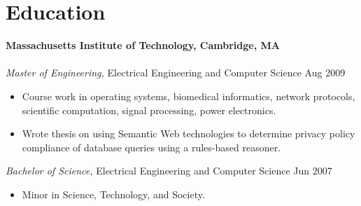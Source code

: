 \section{Education}

\textbf{Massachusetts Institute of Technology, Cambridge, MA} \\
\\
\textit{Master of Engineering,} Electrical Engineering and Computer Science
\hfill Aug 2009
\begin{itemize}  \itemsep -2pt %
\item Course work in operating systems, biomedical informatics, network
      protocols, scientific computation, signal processing, power electronics.
\item Wrote thesis on using Semantic Web technologies to determine privacy
      policy compliance of database queries using a rules-based reasoner.
\end{itemize}
\textit{Bachelor of Science,} Electrical Engineering and Computer Science
\hfill Jun 2007
\begin{itemize}  \itemsep -2pt %
\item Minor in Science, Technology, and Society.
\end{itemize}
